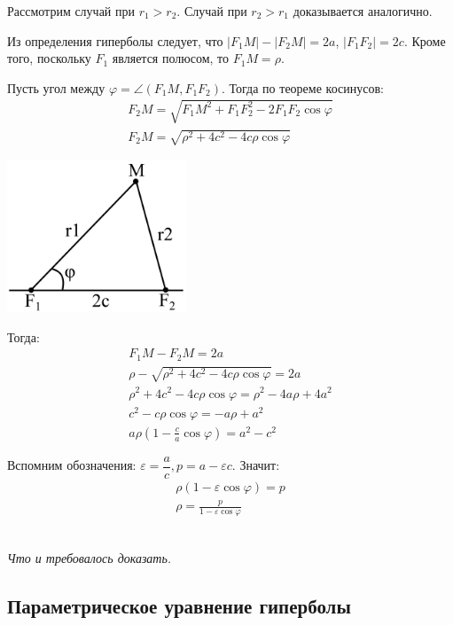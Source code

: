 \documentclass[a4paper,12pt,oneside]{extbook}
\newcommand{\newpar}{$ $\par\nobreak\ignorespaces}
\theoremstyle{numbered}
\theoremstyle{unnumbered}
\theoremstyle{named}
\theoremstyle{unnumbered}
\theoremstyle{named}
\theoremstyle{named}
\theoremstyle{named}
\renewenvironment{proof}[1][]{\breakenv[Доказательство]{\if\relax\detokenize{#1}\relax\else\;\fi}{\textbf{#1}}}{\smallskip\newpar \hfill\textit{Что и требовалось доказать.}}
\begin{document}
\begin{proof}
    Рассмотрим случай при \(r_1 > r_2\). Случай при \(r_2 > r_1\) доказывается аналогично.

    Из определения гиперболы следует, что \(|F_1 M| - |F_2 M| = 2a\), \(|F_1 F_2| = 2c\). Кроме того, поскольку \(F_1\) является полюсом, то \(F_1M = \rho\).

    Пусть угол между \(\varphi = \angle{(F_1M, F_1F_2)}\). Тогда по теореме косинусов:
    \begin{gather*}
        F_2 M = \sqrt{F_1M^2 + F_1F_2^2 - 2F_1F_2\cos{\varphi}} \\
        F_2 M = \sqrt{\rho^2 + 4c^2 - 4c\rho\cos{\varphi}}
    \end{gather*}

    \begin{center}
        \includegraphics[width=0.4\textwidth]{polar_cos.png}
    \end{center}

    Тогда:
    \begin{gather*}
        F_1M - F_2M = 2a \\
        \rho - \sqrt{\rho^2 + 4c^2 - 4c\rho\cos{\varphi}} = 2a \\
        \rho^2 + 4c^2 - 4c\rho\cos{\varphi} = \rho^2 - 4a\rho + 4a^2 \\
        c^2 - c\rho\cos{\varphi} = -a\rho + a^2 \\
        a\rho (1 - \frac{c}{a}\cos{\varphi}) = a^2 - c^2
    \end{gather*}

    Вспомним обозначения: \(\varepsilon = \dfrac{a}{c}, p = a - \varepsilon c\). Значит:
    \begin{gather*}
        \rho(1 - \varepsilon\cos{\varphi}) = p \\
        \rho = \frac{p}{1 - \varepsilon\cos{\varphi}}
    \end{gather*}
\end{proof}

\subsection{Параметрическое уравнение гиперболы}%
\label{sub:Параметрическое уравнение гиперболы}
\end{document}
